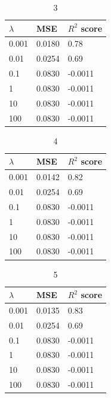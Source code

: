 \documentclass [11pt]{article}
\begin{document}
\begin{table}[H]
\centering
\begin{tabular}{lll}
\hline
$\lambda$ & MSE    & $R^{2}$ score \\ \hline
0.001     & 0.0180 & 0.78          \\
0.01      & 0.0254 & 0.69          \\
0.1       & 0.0830 & -0.0011       \\
1         & 0.0830 & -0.0011       \\
10        & 0.0830 & -0.0011       \\
100       & 0.0830 & -0.0011       \\ \hline
\end{tabular}
\caption{3}
\label{tab:LassoFranke3}
\end{table}

\begin{table}[]
\centering
\begin{tabular}{lll}
\hline
$\lambda$ & MSE    & $R^{2}$ score \\ \hline
0.001     & 0.0142 & 0.82          \\
0.01      & 0.0254 & 0.69          \\
0.1       & 0.0830 & -0.0011       \\
1         & 0.0830 & -0.0011       \\
10        & 0.0830 & -0.0011       \\
100       & 0.0830 & -0.0011       \\ \hline
\end{tabular}
\caption{4}
\label{tab:LassoFranke4}
\end{table}

\begin{table}[]
\centering
\begin{tabular}{lll}
\hline
$\lambda$ & MSE    & $R^{2}$ score \\ \hline
0.001     & 0.0135 & 0.83          \\
0.01      & 0.0254 & 0.69          \\
0.1       & 0.0830 & -0.0011       \\
1         & 0.0830 & -0.0011       \\
10        & 0.0830 & -0.0011       \\
100       & 0.0830 & -0.0011       \\ \hline
\end{tabular}
\caption{5}
\label{tab:LassoFranke5}
\end{table}
\end{document}
